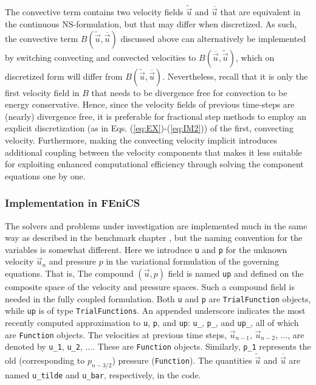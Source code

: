 The convective term contains two velocity fields $\tilde{\vec{u}}$ and
$\overline{\vec{u}}$ that are equivalent in the continuous NS-formulation, but that may differ when
discretized. As such, the convective term
$B(\tilde{\vec{u}},\overline{\vec{u}})$ discussed above can
alternatively be implemented by switching convecting and convected
velocities to $B(\overline{\vec{u}},\tilde{\vec{u}})$, which on
discretized form will differ from
$B(\tilde{\vec{u}},\overline{\vec{u}})$. Nevertheless, recall that it
is only the first velocity field in $B$ that needs to be divergence
free for convection to be energy conservative. Hence, since the
velocity fields of previous time-steps are (nearly) divergence free,
it is preferable for fractional step
methods to employ an explicit discretization (as in
Eqs. (\ref{eq:EX})-(\ref{eq:IM2})) of the first, convecting
velocity. Furthermore, making the convecting velocity implicit
introduces additional coupling between the velocity components that
makes it less suitable for exploiting enhanced computational efficiency
through solving the component equations one by one.

\subsubsection{Implementation in FEniCS}
\label{sec:impl_fenics}
The solvers and problems under investigation are implemented much in the
same way as described in the benchmark chapter \cite{nsbench}, but the naming
convention for the variables is somewhat different. Here we introduce
{\fontsize{12pt}{12pt}\texttt{u}} and {\fontsize{12pt}{12pt}\texttt{p}} for the unknown velocity $\vec{u}_n$ and pressure $p$
in the
variational formulation of the governing equations. That is,
The compound
$(\vec{u},p)$ field is named {\fontsize{12pt}{12pt}\texttt{up}} and
defined on the composite space of the velocity and
pressure spaces. Such a compound field is needed in the 
fully coupled formulation.
Both {\fontsize{12pt}{12pt}\texttt{u}} and {\fontsize{12pt}{12pt}\texttt{p}} are
{\fontsize{12pt}{12pt}\texttt{TrialFunction}} objects, while {\fontsize{12pt}{12pt}\texttt{up}} is of type {\fontsize{12pt}{12pt}\texttt{TrialFunctions}}.
An appended underscore indicates
the most recently computed
approximation to {\fontsize{12pt}{12pt}\texttt{u}}, {\fontsize{12pt}{12pt}\texttt{p}}, and {\fontsize{12pt}{12pt}\texttt{up}}:
{\fontsize{12pt}{12pt}\verb!u_!}, {\fontsize{12pt}{12pt}\verb!p_!}, and {\fontsize{12pt}{12pt}\verb!up_!}, all of which are {\fontsize{12pt}{12pt}\texttt{Function}} objects.
The velocities at previous time steps, $\vec{u}_{n-1}$, $\vec{u}_{n-2}$, $\ldots$, are denoted by {\fontsize{12pt}{12pt}\verb!u_1!}, {\fontsize{12pt}{12pt}\verb!u_2!}, $\ldots$. These are
{\fontsize{12pt}{12pt}\texttt{Function}} objects. Similarly, {\fontsize{12pt}{12pt}\verb!p_1!} represents the old (corresponding to $p_{n-3/2}$)  pressure 
({\fontsize{12pt}{12pt}\texttt{Function}}).
The quantities $\tilde{\vec{u}}$ and $\overline{\vec{u}}$ are
named {\fontsize{12pt}{12pt}\verb!u_tilde!} and {\fontsize{12pt}{12pt}\verb!u_bar!}, respectively, in the code.


